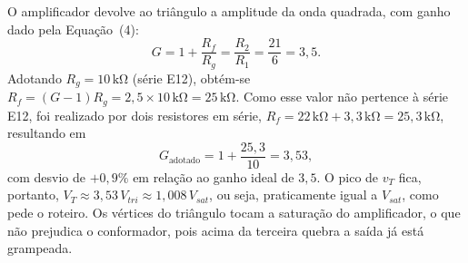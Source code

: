 \documentclass[11pt,a4paper]{article}
\begin{document}
O amplificador devolve ao triângulo a amplitude da onda quadrada, com ganho dado pela Equação~(4):
\begin{equation}
G = 1 + \frac{R_f}{R_g} = \frac{R_2}{R_1} = \frac{21}{6} = 3{,}5.
\end{equation}
Adotando \(R_g = 10\,\mathrm{k\Omega}\) (série E12), obtém-se \(R_f = (G - 1)R_g = 2{,}5 \times 10\,\mathrm{k\Omega} = 25\,\mathrm{k\Omega}\). Como esse valor não pertence à série E12, foi realizado por dois resistores em série, \(R_f = 22\,\mathrm{k\Omega} + 3{,}3\,\mathrm{k\Omega} = 25{,}3\,\mathrm{k\Omega}\), resultando em
\begin{equation}
G_{\text{adotado}} = 1 + \frac{25{,}3}{10} = 3{,}53,
\end{equation}
com desvio de \(+0{,}9\%\) em relação ao ganho ideal de \(3{,}5\). O pico de \(v_T\) fica, portanto, \(V_T \approx 3{,}53\,V_{tri} \approx 1{,}008\,V_{sat}\), ou seja, praticamente igual a \(V_{sat}\), como pede o roteiro. Os vértices do triângulo tocam a saturação do amplificador, o que não prejudica o conformador, pois acima da terceira quebra a saída já está grampeada.
\end{document}
